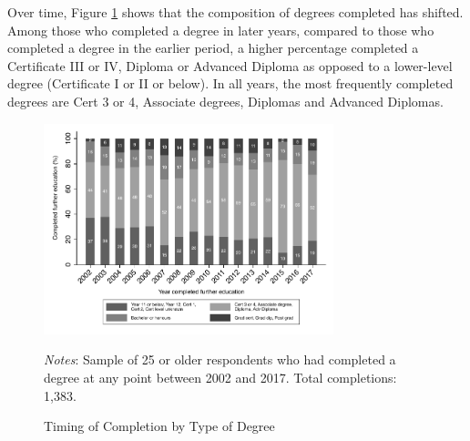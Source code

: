 \documentclass[12pt, a4paper]{article}
\begin{document}
Over time, Figure \ref{fig:yearcompdeg} shows that the composition of degrees completed has shifted. Among those who completed a degree in later years, compared to those who completed a degree in the earlier period, a higher percentage completed a Certificate III or IV, Diploma or Advanced Diploma as opposed to a lower-level degree (Certificate I or II or below). In all years, the most frequently completed degrees are Cert 3 or 4, Associate degrees, Diplomas and Advanced Diplomas. 

\singlespacing
\begin{figure}[htbp]
\centering
\caption{Timing of Completion by Type of Degree}
\vspace{0.5cm}
  \label{fig:yearcompdeg}
    \includegraphics[width=0.75\textwidth]{_figures/year_completed_bydegree.pdf}
\parbox{1\textwidth}{\footnotesize{\textit{Notes}: Sample of 25 or older respondents who had completed a degree at any point between 2002 and 2017. Total completions: 1,383.}}
\end{figure}
\doublespacing


\end{document}
